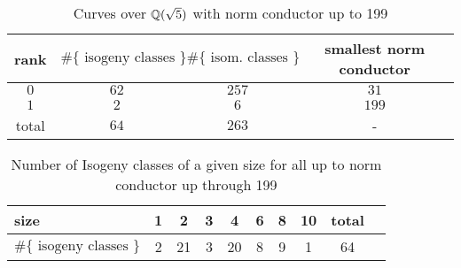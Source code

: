 \documentclass{amsart}
\begin{document}
\begin{center}
\begin{table}[h]
\caption{Curves over $\mathbb{Q}(\sqrt{5})$ with norm conductor up to 199\label{table:rank-counts}}
\begin{tabular}{|c|c|c|c|}\hline
rank & $\#\{\text{ isogeny classes }\}$ &  $\#\{\text{ isom. classes }\}$ & smallest norm conductor\\\hline
 $0$ & $62$ & $257$ & $31$\\\hline
 $1$ & $2$ & $6$ & $199$\\\hline
total & $64$ & $263$ & - \\\hline
\end{tabular}
\end{table}
\end{center}



\begin{center}
\begin{table}[h]
\caption{Number of Isogeny classes of a given size for all up to norm conductor up through 199\label{table:counts}}
\begin{tabular}{|l|c|c|c|c|c|c|c|c|c|}\hline
size                           & 1 & 2  & 3 & 4  & 6 & 8 & 10 & total \\ \hline
$\#\{\text{ isogeny classes }\}$ & 2 & 21 & 3 & 20 & 8 & 9 & 1  & 64 \\\hline
\end{tabular}
\end{table}
\end{center}
\end{document}
